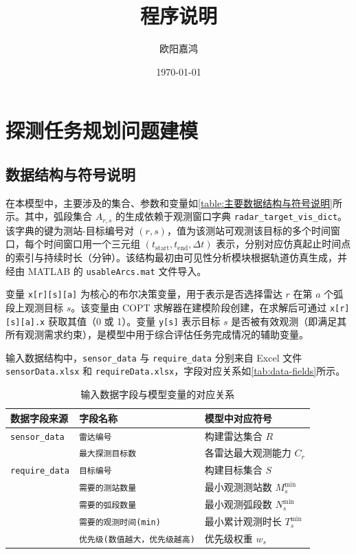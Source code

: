 \documentclass[openany,12pt,UTF8]{ctexart}
\title{程序说明}
\author{欧阳嘉鸿}
\date{\today}
\begin{document}
\maketitle
\newpage
\tableofcontents
\newpage
\section{探测任务规划问题建模}

\subsection{数据结构与符号说明}
在本模型中，主要涉及的集合、参数和变量如\autoref{table:主要数据结构与符号说明}所示。其中，弧段集合 $A_{r,s}$ 的生成依赖于观测窗口字典 \texttt{radar\_target\_vis\_dict}。该字典的键为测站-目标编号对 $(r,s)$，值为该测站可观测该目标的多个时间窗口，每个时间窗口用一个三元组 $(t_{\text{start}}, t_{\text{end}}, \Delta t)$ 表示，分别对应仿真起止时间点的索引与持续时长（分钟）。该结构最初由可见性分析模块根据轨道仿真生成，并经由 MATLAB 的 \texttt{usableArcs.mat} 文件导入。

变量 \texttt{x[r][s][a]} 为核心的布尔决策变量，用于表示是否选择雷达 $r$ 在第 $a$ 个弧段上观测目标 $s$。该变量由 COPT 求解器在建模阶段创建，在求解后可通过 \texttt{x[r][s][a].x} 获取其值（0 或 1）。变量 \texttt{y[s]} 表示目标 $s$ 是否被有效观测（即满足其所有观测需求约束），是模型中用于综合评估任务完成情况的辅助变量。

输入数据结构中，\texttt{sensor\_data} 与 \texttt{require\_data} 分别来自 Excel 文件 \texttt{sensorData.xlsx} 和 \texttt{requireData.xlsx}，字段对应关系如\autoref{tab:data-fields}所示。
\begin{table}[H]
    \centering
    \caption{输入数据字段与模型变量的对应关系}
    \label{tab:data-fields}
    \begin{tabular}{lll}
        \toprule
        \textbf{数据字段来源}        & \textbf{字段名称}            & \textbf{模型中对应符号}      \\
        \midrule
        \texttt{sensor\_data}  & \texttt{雷达编号}            & 构建雷达集合 $R$            \\
                               & \texttt{最大探测目标数}         & 各雷达最大观测能力 $C_r$       \\
        \addlinespace
        \texttt{require\_data} & \texttt{目标编号}            & 构建目标集合 $S$            \\
                               & \texttt{需要的测站数量}         & 最小观测测站数 $M_s^{\min}$  \\
                               & \texttt{需要的弧段数量}         & 最小观测弧段数 $N_s^{\min}$  \\
                               & \texttt{需要的观测时间(min)}    & 最小累计观测时长 $T_s^{\min}$ \\
                               & \texttt{优先级(数值越大，优先级越高)} & 优先级权重 $w_s$           \\
        \bottomrule
    \end{tabular}
\end{table}
\end{document}
